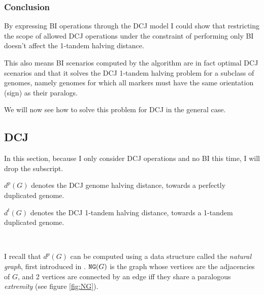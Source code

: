 \documentclass[11pt,final,twoside,nofrench]{thlifl}
\renewcommand{\NG}{\ensuremath{\mbox{\texttt{NG}}}}
\begin{document}
\subsubsection{Conclusion}
\noindent
By expressing BI operations through the DCJ model I could show that restricting the scope of allowed DCJ operations under the constraint of performing only BI doesn't affect the 1-tandem halving distance.

This also means BI scenarios computed by the algorithm are in fact optimal DCJ scenarios and that it solves the DCJ 1-tandem halving problem for a subclass of genomes, namely genomes for which all markers must have the same orientation (sign) as their paralogs.

We will now see how to solve this problem for DCJ in the general case.

\subsection{DCJ}

\def\EP{{{\textsc{EP}}}}
\def\EC{{{\textsc{EC}}}}
\def\OC{{{\textsc{OC}}}}
\def\OP{{{\textsc{OP}}}}

In this section, because I only consider DCJ operations and no BI this time, I will drop the subscript.

$d^p(G)$ denotes the DCJ genome halving distance, towards a perfectly duplicated genome.

$d^t(G)$ denotes the DCJ 1-tandem halving distance, towards a 1-tandem duplicated genome.

~~

I recall that $d^{p}(G)$ can be computed using a data structure called the
\emph{natural graph}, first introduced in \cite{Mabrouk03}.  $\NG(G)$
is the graph whose vertices are the adjacencies of $G$, and 2 vertices
are connected by an edge iff they share a paralogous \emph{extremity} (see figure
\ref{fig:NG}).
\end{document}
